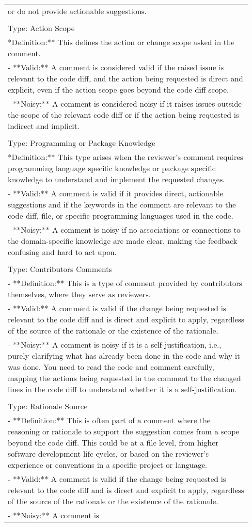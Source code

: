 \begin{table*}[!t]
\begin{tabular}{p{\textwidth}}
or do not provide actionable suggestions. \\\\ Type: Action Scope\\**Definition:** This defines the action or change scope asked in the comment.\\- **Valid:**  A comment is considered valid if the raised issue is relevant to the code diff, and the action being requested is direct and explicit, even if the action scope goes beyond the code diff scope.\\- **Noisy:** A comment is considered noisy if it raises issues outside the scope of the relevant code diff or if the action being requested is indirect and implicit.\\\\ Type: Programming or Package Knowledge  \\**Definition:** This type arises when the reviewer's comment requires programming language specific knowledge or package specific knowledge to understand and implement the requested changes.\\- **Valid:** A comment is valid if it provides direct, actionable suggestions and if the keywords in the comment are relevant to the code diff, file, or specific programming languages used in the code.\\- **Noisy:** A comment is noisy if no associations or connections to the domain-specific knowledge are made clear, making the feedback confusing and hard to act upon.\\\\ Type: Contributors Comments\\- **Definition:** This is a type of comment provided by contributors themselves, where they serve as reviewers.\\- **Valid:** A comment is valid if the change being requested is relevant to the code diff and is direct and explicit to apply, regardless of the source of the rationale or the existence of the rationale.\\- **Noisy:** A comment is noisy if it is a self-justification, i.e., purely clarifying what has already been done in the code and why it was done. You need to read the code and comment carefully, mapping the actions being requested in the comment to the changed lines in the code diff to understand whether it is a self-justification.\\\\ Type: Rationale Source\\- **Definition:** This is often part of a comment where the reasoning or rationale to support the suggestion comes from a scope beyond the code diff. This could be at a file level, from higher software development life cycles, or based on the reviewer's experience or conventions in a specific project or language.\\- **Valid:** A comment is valid if the change being requested is relevant to the code diff and is direct and explicit to apply, regardless of the source of the rationale or the existence of the rationale.\\- **Noisy:** A comment is 
\end{tabular}
\end{table*}
